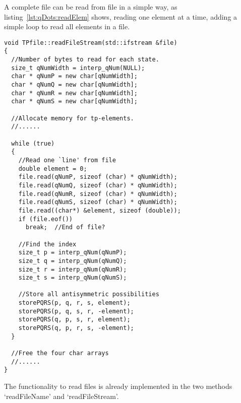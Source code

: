 A complete file can be read from file in a simple way, as listing~\ref{lst:qDots:readElem} shows, reading one element at a time, adding a  simple loop to read all elements in a file.
\begin{lstlisting}[float,label={lst:qDots:readElem},caption={How to read two-particle elements from file.}]
void TPfile::readFileStream(std::ifstream &file)
{
  //Number of bytes to read for each state.
  size_t qNumWidth = interp_qNum(NULL);
  char * qNumP = new char[qNumWidth];
  char * qNumQ = new char[qNumWidth];
  char * qNumR = new char[qNumWidth];
  char * qNumS = new char[qNumWidth];

  //Allocate memory for tp-elements.
  //......

  while (true)
  {
    //Read one `line' from file
    double element = 0;
    file.read(qNumP, sizeof (char) * qNumWidth);
    file.read(qNumQ, sizeof (char) * qNumWidth);
    file.read(qNumR, sizeof (char) * qNumWidth);
    file.read(qNumS, sizeof (char) * qNumWidth);
    file.read((char*) &element, sizeof (double));
    if (file.eof())
      break;  //End of file?

	//Find the index
    size_t p = interp_qNum(qNumP);
    size_t q = interp_qNum(qNumQ);
    size_t r = interp_qNum(qNumR);
    size_t s = interp_qNum(qNumS);

    //Store all antisymmetric possibilities 
    storePQRS(p, q, r, s, element);
    storePQRS(p, q, s, r, -element);
    storePQRS(q, p, s, r, element);
    storePQRS(q, p, r, s, -element);
  }

  //Free the four char arrays
  //......
}
\end{lstlisting}
The functionality to read files is already implemented in the two methods `readFileName' and `readFileStream'.






